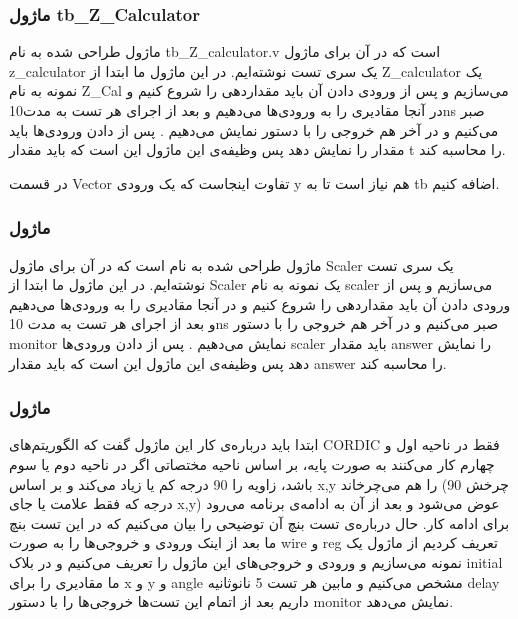 \documentclass[12pt,titlepage,a4page , tikz , multi,table , svgnames,xcdraw]{article}
\begin{document}
\subsubsection{ماژول tb\_Z\_Calculator}

ماژول طراحی شده  به نام tb\_Z\_calculator.v   است که در آن برای ماژول z\_calculator  یک سری تست نوشته‌ایم. در این ماژول ما ابتدا از Z\_calculator  یک نمونه به نام Z\_Cal  می‌سازیم و پس از ورودی دادن آن باید مقداردهی را شروع کنیم و در آنجا مقادیری را به ورودی‌ها می‌دهیم و بعد از اجرای هر تست به مدت10ns  صبر می‌کنیم و در آخر هم خروجی را با  دستور   نمایش می‌دهیم . پس از  دادن ورودی‌ها   باید مقدار   را نمایش دهد پس وظیفه‌ی این ماژول این است که باید مقدار t  را محاسبه کند.

در قسمت Vector تفاوت اینجاست که یک ورودی y هم نیاز است تا به tb اضافه کنیم.

\subsubsection{ماژول }


ماژول طراحی شده  به نام    است که در آن برای ماژول Scaler یک سری تست نوشته‌ایم. در این ماژول ما ابتدا از Scaler یک نمونه به نام scaler می‌سازیم و پس از ورودی دادن آن باید مقداردهی را شروع کنیم و در آنجا مقادیری را به ورودی‌ها می‌دهیم و بعد از اجرای هر تست به مدت 10ns  صبر می‌کنیم و در آخر هم خروجی را با  دستور monitor  نمایش می‌دهیم . پس از  دادن ورودی‌ها scaler باید مقدار answer را نمایش دهد پس وظیفه‌ی این ماژول این است که باید مقدار answer را محاسبه کند.

\subsubsection{ماژول }


ابتدا باید درباره‌ی کار این ماژول گفت که الگوریتم‌های CORDIC فقط در ناحیه اول و چهارم کار می‌کنند به صورت پایه،  بر اساس ناحیه مختصاتی اگر در ناحیه دوم یا سوم باشد،  زاویه را 90  درجه کم یا زیاد می‌کند و بر اساس  x,y را هم می‌چرخاند (چرخش 90 درجه که فقط علامت یا جای x,y) عوض می‌شود و بعد از آن به ادامه‌ی برنامه می‌رود برای ادامه کار.
حال درباره‌ی تست بنچ آن توضیحی را بیان می‌کنیم که در این تست بنچ ما بعد از اینک ورودی و خروجی‌ها را به صورت wire  و reg  تعریف کردیم از ماژول   یک نمونه می‌سازیم و ورودی و خروجی‌های این ماژول را تعریف می‌کنیم  و در بلاک initial  ما مقادیری را برای x  و y  و angle  مشخص می‌کنیم و مابین هر تست 5 نانوثانیه delay  داریم بعد از اتمام این تست‌ها خروجی‌ها را با دستور monitor  نمایش می‌دهد.
\end{document}
